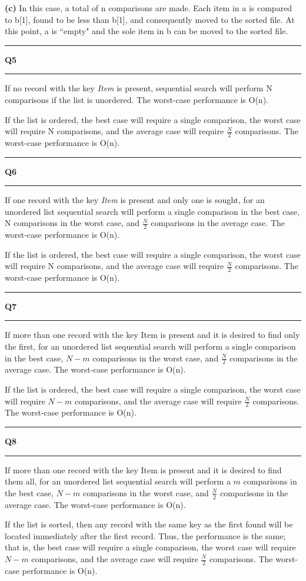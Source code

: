 \documentclass[11pt]{article}
\newcommand\question[2]{\vspace{.25in}\hrule\textbf{#1 #2}\vspace{.5em}\hrule\vspace{.10in}}
\renewcommand\part[1]{\vspace{.10in}\textbf{(#1)}}
\begin{document}
\part{c} In this case, a total of n comparisons are made. Each item in a is compared to b[1], found to be less than b[1], and consequently moved to the sorted file. At this point, a is ``empty" and the sole item in b can be moved to the sorted file.

\question{Q5}{}
If no record with the key \textit{Item} is present, sequential search will perform N comparisons if the list is unordered. The worst-case performance is O(n). 

If the list is ordered, the best case will require a single comparison, the worst case will require N comparisons, and the average case will require $\frac{N}{2}$ comparisons. The worst-case performance is O(n).

\question{Q6}{}
If one record with the key \textit{Item} is present and only one is sought,  for an unordered list sequential search will perform a single comparison in the best case, N comparisons in the worst case, and $\frac{N}{2}$ comparisons in the average case. The worst-case performance is O(n). 

If the list is ordered, the best case will require a single comparison, the worst case will require N comparisons, and the average case will require $\frac{N}{2}$ comparisons.  The worst-case performance is O(n).

\question{Q7}{}
If more than one record with the key Item is present and it is desired to find only the first, for an unordered list sequential search will perform a single comparison in the best case, $N-m$ comparisons in the worst case, and $\frac{N}{2}$ comparisons in the average case. The worst-case performance is O(n). 

If the list is ordered, the best case will require a single comparison, the worst case will require $N-m$ comparisons, and the average case will require $\frac{N}{2}$ comparisons.  The worst-case performance is O(n).

\question{Q8}{}
If more than one record with the key Item is present and it is desired to find them all, for an unordered list sequential search will perform a $m$ comparisons in the best case, $N-m$ comparisons in the worst case, and $\frac{N}{2}$ comparisons in the average case. The worst-case performance is O(n). 

If the list is sorted, then any record with the same key as the first found will be located immediately after the first record. Thus, the performance is the same; that is, the best case will require a single comparison, the worst case will require $N-m$ comparisons, and the average case will require $\frac{N}{2}$ comparisons.  The worst-case performance is O(n).
\end{document}
